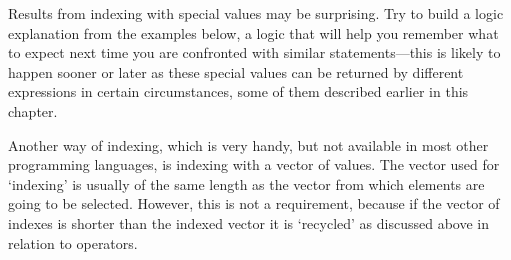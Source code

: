 \documentclass[krantz2]{krantz}\usepackage{knitr}%
\begin{document}
\begin{playground}
Results from indexing with special values may be surprising. Try to build a logic explanation from the examples below, a logic that will help you remember what to expect next time you are confronted with similar statements---this is likely to happen sooner or later as these special values can be returned by different \Rlang expressions in certain circumstances, some of them described earlier in this chapter.

\begin{knitrout}\footnotesize
{}\color{fgcolor}\begin{kframe}
\begin{alltt}
\hlstd{a[}\hlstd{]}
\hlstd{a[}\hlstd{(}\hlstd{)]}
\hlstd{a[}\hlstd{]}
\hlstd{a[}\hlstd{(}\hlstd{,} \hlstd{)]}
\hlstd{a[}\hlstd{]}
\hlstd{a[}\hlstd{(}\hlstd{,} \hlstd{)]}
\end{alltt}
\end{kframe}
\end{knitrout}
\end{playground}

Another way of indexing, which is very handy, but not available in most other programming languages, is indexing with a vector of  values. The  vector used for `indexing' is usually of the same length as the vector from which elements are going to be selected. However, this is not a requirement, because if the  vector of indexes is shorter than the indexed vector it is `recycled' as discussed above in relation to operators.
\end{document}
